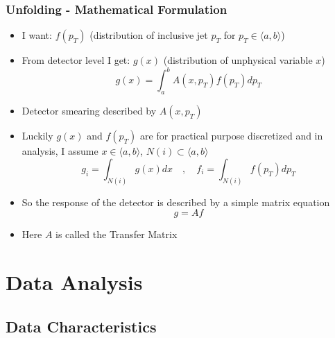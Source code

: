 \documentclass[compress]{beamer}
\newcommand{\pt}{p_{T}}
\begin{document}
\begin{frame}
\frametitle{Unfolding - Mathematical Formulation}
\begin{itemize}
  \item I want: $f(\pt)$ (distribution of inclusive jet $\pt$ for $\pt \in
    \langle a, b \rangle$)
  \item From detector level I get: $g(x)$ (distribution of unphysical variable
    $x$)
  \begin{equation*}
    g(x) = \int_a^b A(x,\pt) f(\pt) d\pt
  \end{equation*}
  \item Detector smearing described by $A(x,\pt)$
  \item Luckily $g(x)$ and $f(\pt)$ are for practical purpose discretized and in
    analysis, I assume $x \in \langle a, b \rangle$, $N(i) \subset \langle
    a , b \rangle$ 
  \begin{equation*}
    g_i = \int_{N(i)}g(x)dx \quad , \quad f_i = \int_{N(i)}f(\pt)d\pt
  \end{equation*}
  \item So the response of the detector is described by a simple matrix equation
    \begin{equation*}
      g = A f
    \end{equation*}
  \item Here $A$ is called the Transfer Matrix
\end{itemize}
\end{frame}

\section{Data Analysis}
\subsection{Data Characteristics}
\end{document}

